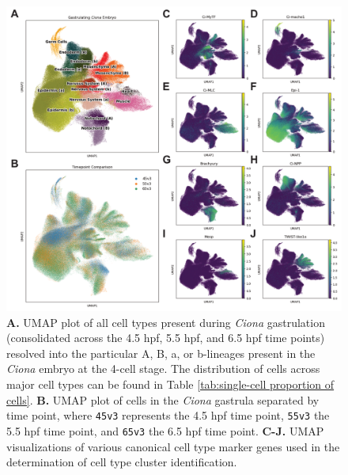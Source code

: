 \begin{figure}[p]
    \centering
    \includegraphics[scale=.8]{4_figures-and-files/Fig1_Single-Cell-Atlas-Clustering.png}
    \caption[Single-cell transcriptome atlas of the developing \textit{Ciona} gastrula]{\textbf{A.} UMAP plot of all cell types present during \textit{Ciona} gastrulation (consolidated across the 4.5 hpf, 5.5 hpf, and 6.5 hpf time points) resolved into the particular A, B, a, or b-lineages present in the \textit{Ciona} embryo at the 4-cell stage. The distribution of cells across major cell types can be found in Table \ref{tab:single-cell proportion of cells}. \textbf{B.} UMAP plot of cells in the \textit{Ciona} gastrula separated by time point, where \texttt{45v3} represents the 4.5 hpf time point, \texttt{55v3} the 5.5 hpf time point, and \texttt{65v3} the 6.5 hpf time point. \textbf{C-J.} UMAP visualizations of various canonical cell type marker genes used in the determination of cell type cluster identification.}
    \label{fig:1 single cell clustering}
\end{figure}

